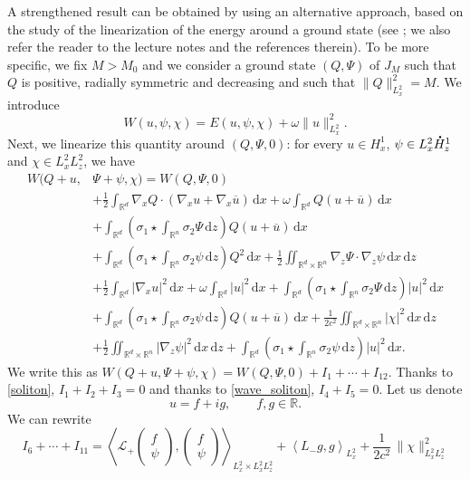 \documentclass[10pt]{amsart}
\let\bar\oldbar
\theoremstyle{definition}
\newcommand*{\overbigdot}[1]{%
\accentset{\mbox{\large\bfseries .}}{#1}}
\let\bar\overline
\newcommand{\R}{\mathbb{R}}
\let\ds\displaystyle
\newcommand{\ud}{\, {\mathrm{d}}}
\begin{document}
A strengthened result can be obtained by using an alternative approach, based on the study of the linearization of the energy around a ground state (see
\cite{MaMe,Weinstein1,Weinstein2}; we also refer the reader to the lecture notes \cite[\S 2.6]{Martel} and the references therein). To be more specific, we fix $M>M_{0}$ and we consider a ground state $(Q,\Psi)$ of $J_{M}$ such that $Q$ is positive, radially symmetric and decreasing and such that $\|Q\|_{L_{x}^{2}}^{2}=M$. We introduce
\[
W(u,\psi,\chi)=E(u,\psi,\chi)+\omega\|u\|_{L_{x}^{2}}^{2}.
\]
Next, we linearize this quantity around $(Q,\Psi,0)$: for every $u\in H_{x}^{1}$, $\psi\in L_{x}^{2}\overbigdot{H}_{z}^{1}$ and $\chi\in L_{x}^{2}L_{z}^{2}$, we have\vspace*{-3pt}
\begin{align*}
\ds W(Q+u,&\Psi+\psi,\chi)=W(Q,\Psi,0)\\
&+ \ds \frac{1}{2}\int_{\R^{d}}\nabla_{x}Q\cdot(\nabla_{x}u+\nabla_{x}\bar{u})\ud x+\omega\int_{\R^{d}}Q(u+\bar{u})\ud x
\\
&+\ds\int_{\R^{d}}\left(\sigma_{1}\star\int_{\R^{n}}\sigma_{2}\Psi\ud z\right)Q(u+\bar{u})\ud x
\\
&+\ds\int_{\R^{d}}\left(\sigma_{1}\star\int_{\R^{n}}\sigma_{2}\psi\ud z\right)Q^{2}\ud x+\frac{1}{2}\iint_{\R^{d}\times\R^{n}}\nabla_{z}\Psi\cdot\nabla_{z}\psi\ud x\ud z
\\
&\ds +\frac{1}{2}\int_{\R^{d}}|\nabla_{x}u|^{2}\ud x+\omega\int_{\R^{d}}|u|^{2}\ud x+\int_{\R^{d}}\left(\sigma_{1}\star\int_{\R^{n}}\sigma_{2}\Psi\ud z\right)|u|^{2}\ud x\\
&\ds +\int_{\R^{d}}\left(\sigma_{1}\star\int_{\R^{n}}\sigma_{2}\psi\ud z\right)Q(u+\bar{u})\ud x+\frac{1}{2c^{2}}\iint_{\R^{d}\times\R^{n}}|\chi|^{2}\ud x\ud z
\\
&+\ds\frac{1}{2}\iint_{\R^{d}\times\R^{n}}|\nabla_{z}\psi|^{2}\ud x\ud z
+ \ds \int_{\R^{d}}\left(\sigma_{1}\star\int_{\R^{n}}\sigma_{2}\psi\ud z\right)|u|^{2}\ud x.
\end{align*}
We write this as $W(Q+u,\Psi+\psi,\chi)=W(Q,\Psi,0)+I_1+\cdots+I_{12}$.
Thanks to \eqref{soliton}, $I_1+I_2+I_3=0$ and thanks to \eqref{wave_soliton}, $I_4+I_5=0$. Let us denote\vspace*{-3pt}
\[
u=f+i g,\qquad f,g\in \mathbb R.
\]
We can rewrite\vspace*{-3pt}
\[
I_ 6+\cdots+I_{11}= \left\langle\mathcal{L}_{+}\begin{pmatrix} f\\\psi \end{pmatrix},\begin{pmatrix} f\\\psi \end{pmatrix}\right\rangle_{L_{x}^{2}\times L_{x}^{2}L_{z}^{2}}+\left\langle L_{-}g,g\right\rangle_{L_{x}^{2}}+\frac{1}{2c^{2}}\,\|\chi\|_{L_{x}^{2}L_{z}^{2}}^{2}
\]
\end{document}
